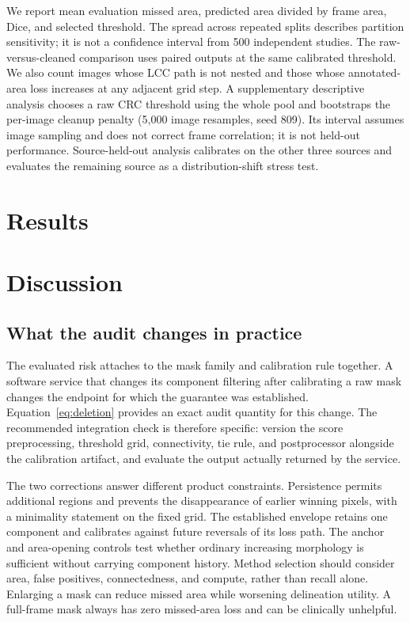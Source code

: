 \documentclass[11pt,a4paper]{article}
\begin{document}
We report mean evaluation missed area, predicted area divided by frame area, Dice, and selected threshold. The spread across repeated splits describes partition sensitivity; it is not a confidence interval from 500 independent studies. The raw-versus-cleaned comparison uses paired outputs at the same calibrated threshold. We also count images whose LCC path is not nested and those whose annotated-area loss increases at any adjacent grid step. A supplementary descriptive analysis chooses a raw CRC threshold using the whole pool and bootstraps the per-image cleanup penalty (5,000 image resamples, seed 809). Its interval assumes image sampling and does not correct frame correlation; it is not held-out performance. Source-held-out analysis calibrates on the other three sources and evaluates the remaining source as a distribution-shift stress test.

\section{Results}


\section{Discussion}
\subsection{What the audit changes in practice}
The evaluated risk attaches to the mask family and calibration rule together. A software service that changes its component filtering after calibrating a raw mask changes the endpoint for which the guarantee was established. Equation~\eqref{eq:deletion} provides an exact audit quantity for this change. The recommended integration check is therefore specific: version the score preprocessing, threshold grid, connectivity, tie rule, and postprocessor alongside the calibration artifact, and evaluate the output actually returned by the service.

The two corrections answer different product constraints. Persistence permits additional regions and prevents the disappearance of earlier winning pixels, with a minimality statement on the fixed grid. The established envelope retains one component and calibrates against future reversals of its loss path. The anchor and area-opening controls test whether ordinary increasing morphology is sufficient without carrying component history. Method selection should consider area, false positives, connectedness, and compute, rather than recall alone. Enlarging a mask can reduce missed area while worsening delineation utility. A full-frame mask always has zero missed-area loss and can be clinically unhelpful.
\end{document}

